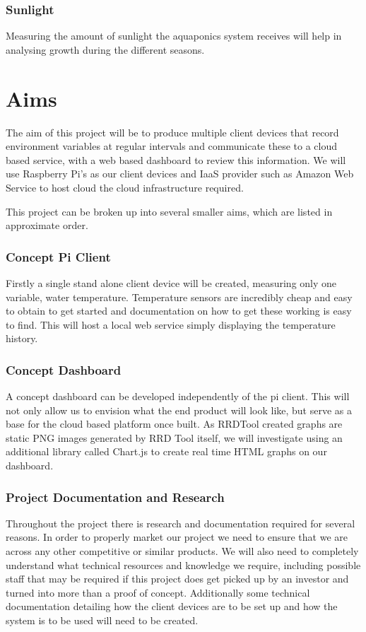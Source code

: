 \documentclass[11pt, oneside, a4paper, titlepage]{article}
\begin{document}
\subsubsection{Sunlight}
Measuring the amount of sunlight the aquaponics system receives will help in analysing growth during the different seasons. 

\section{Aims}
The aim of this project will be to produce multiple client devices that record environment variables at regular intervals and communicate these to a cloud based service, with a web based dashboard to review this information.  We will use Raspberry Pi's as our client devices and IaaS provider such as Amazon Web Service to host cloud the cloud infrastructure required. 

This project can be broken up into several smaller aims, which are listed in approximate order. 

\subsubsection{Concept Pi Client}
Firstly a single stand alone client device will be created, measuring only one variable, water temperature. Temperature sensors are incredibly cheap and easy to obtain to get started and documentation on how to get these working is easy to find.  This will host a local web service simply displaying the temperature history. 

\subsubsection{Concept Dashboard}
A concept dashboard can be developed independently of the pi client.  This will not only allow us to envision what the end product will look like, but serve as a base for the cloud based platform once built.  As RRDTool created graphs are static PNG images generated by RRD Tool itself, we will investigate using an additional library called Chart.js to create real time HTML graphs on our dashboard. 

\subsubsection{Project Documentation and Research}
Throughout the project there is research and documentation required for several reasons.  In order to properly market our project we need to ensure that we are across any other competitive or similar products.  We will also need to completely understand what technical resources and knowledge we require, including possible staff that may be required if this project does get picked up by an investor and turned into more than a proof of concept.  Additionally some technical documentation detailing how the client devices are to be set up and how the system is to be used will need to be created. 
\end{document}
